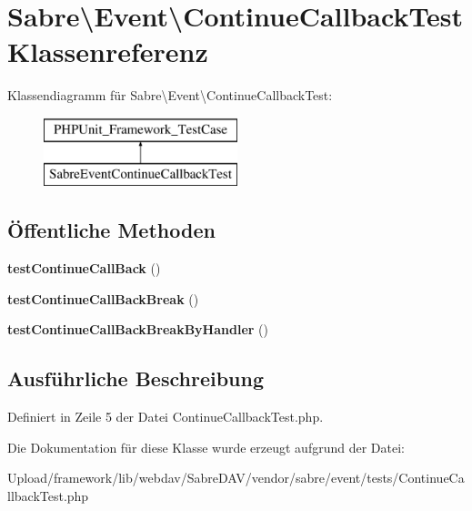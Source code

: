 \hypertarget{class_sabre_1_1_event_1_1_continue_callback_test}{}\section{Sabre\textbackslash{}Event\textbackslash{}Continue\+Callback\+Test Klassenreferenz}
\label{class_sabre_1_1_event_1_1_continue_callback_test}
Klassendiagramm für Sabre\textbackslash{}Event\textbackslash{}Continue\+Callback\+Test\+:\begin{figure}[H]
\begin{center}
\leavevmode
\includegraphics[height=2.000000cm]{class_sabre_1_1_event_1_1_continue_callback_test}
\end{center}
\end{figure}
\subsection*{Öffentliche Methoden}
\begin{DoxyCompactItemize}
\item 
\mbox{\label{class_sabre_1_1_event_1_1_continue_callback_test_aebd43524e21136078b60a50a5b37f10f}} 
{\bfseries test\+Continue\+Call\+Back} ()
\item 
\mbox{\label{class_sabre_1_1_event_1_1_continue_callback_test_adaa56215a837239e710d101a1d7451df}} 
{\bfseries test\+Continue\+Call\+Back\+Break} ()
\item 
\mbox{\label{class_sabre_1_1_event_1_1_continue_callback_test_a1cedd3b319c523ee393a7c993fd4dc1a}} 
{\bfseries test\+Continue\+Call\+Back\+Break\+By\+Handler} ()
\end{DoxyCompactItemize}


\subsection{Ausführliche Beschreibung}


Definiert in Zeile 5 der Datei Continue\+Callback\+Test.\+php.



Die Dokumentation für diese Klasse wurde erzeugt aufgrund der Datei\+:\begin{DoxyCompactItemize}
\item 
Upload/framework/lib/webdav/\+Sabre\+D\+A\+V/vendor/sabre/event/tests/Continue\+Callback\+Test.\+php\end{DoxyCompactItemize}
